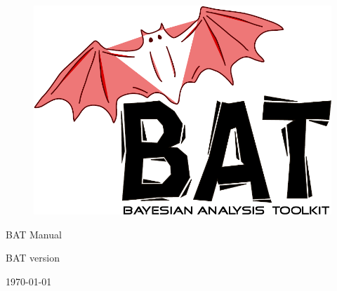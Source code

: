 \documentclass[
10pt,
a4paper,
bibliography=totoc,
captions=nooneline, %
numbers=noenddot,
twoside]{scrbook}
\newcommand{\BAT}{{\scshape BAT}\xspace}
\newcommand{\version}{version~\versionno}
\begin{document}

\thispagestyle{empty}

\begin{figure}
\includegraphics[scale=0.25]{bat}
\end{figure}

\vspace*{1cm}

\begin{center}


{\Large \BAT Manual}
\\

\vspace{1cm}

{\large \BAT \version}

\end{center}

\thispagestyle{empty}

\vfill

\begin{center}
\today
\end{center}

\pagebreak


\thispagestyle{empty}

\enlargethispage{2cm}

\tableofcontents{}


\mainmatter
\end{document}

